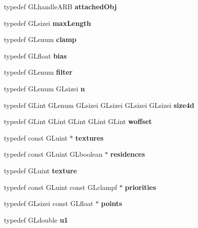\begin{DoxyCompactItemize}
\item 
typedef G\+Lhandle\+A\+R\+B {\bfseries attached\+Obj}\label{_s_d_l__opengl_8h_a284d5062b8beb22ea1fd5e0ee03084ef}

\item 
typedef G\+Lsizei {\bfseries max\+Length}\label{_s_d_l__opengl_8h_a5c0738fe9fcce8c6b2d54e2a3b951a97}

\item 
typedef G\+Lenum {\bfseries clamp}\label{_s_d_l__opengl_8h_a3878d3005eeb2d2ef414abc752ba3c9b}

\item 
typedef G\+Lfloat {\bfseries bias}\label{_s_d_l__opengl_8h_a39c3ffa18f420251c5d132dd8c1c6137}

\item 
typedef G\+Lenum {\bfseries filter}\label{_s_d_l__opengl_8h_ab3664546554b8fc4b0b5a1a981ad97ec}

\item 
typedef G\+Lenum G\+Lsizei {\bfseries n}\label{_s_d_l__opengl_8h_a0788d3762d0c3c76e4c094d8078b4c27}

\item 
typedef G\+Lint G\+Lenum G\+Lsizei G\+Lsizei G\+Lsizei G\+Lsizei {\bfseries size4d}\label{_s_d_l__opengl_8h_a3ee638722d778306b1776526a7711d9a}

\item 
typedef G\+Lint G\+Lint G\+Lint G\+Lint G\+Lint {\bfseries woffset}\label{_s_d_l__opengl_8h_ad57a355b89bd6780d0797d5a72d15514}

\item 
typedef const G\+Luint $\ast$ {\bfseries textures}\label{_s_d_l__opengl_8h_a450062c0770127a605331b58382bfa3b}

\item 
typedef const G\+Luint G\+Lboolean $\ast$ {\bfseries residences}\label{_s_d_l__opengl_8h_a1b73b6faf5e03196654860a3c89c8265}

\item 
typedef G\+Luint {\bfseries texture}\label{_s_d_l__opengl_8h_a8f486379aef534669f4f06f515e7ce6c}

\item 
typedef const G\+Luint const G\+Lclampf $\ast$ {\bfseries priorities}\label{_s_d_l__opengl_8h_ab2d88f127452baef8666791f74e9a794}

\item 
typedef G\+Lsizei const G\+Lfloat $\ast$ {\bfseries points}\label{_s_d_l__opengl_8h_ae75d9f560170dfeaadc8718c87f5fbec}

\item 
typedef G\+Ldouble {\bfseries u1}\label{_s_d_l__opengl_8h_ab296853c9d55bfdc62cda6c50d1b4781}


\end{DoxyCompactItemize}
